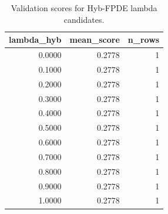 \begin{table}[t]
\caption{Validation scores for Hyb-FPDE lambda candidates.}
\label{tab:lambda_distribution_computed}
\centering
\begin{tabular}{rrr}
\toprule
lambda\_hyb & mean\_score & n\_rows \\
\midrule
0.0000 & 0.2778 & 1 \\
0.1000 & 0.2778 & 1 \\
0.2000 & 0.2778 & 1 \\
0.3000 & 0.2778 & 1 \\
0.4000 & 0.2778 & 1 \\
0.5000 & 0.2778 & 1 \\
0.6000 & 0.2778 & 1 \\
0.7000 & 0.2778 & 1 \\
0.8000 & 0.2778 & 1 \\
0.9000 & 0.2778 & 1 \\
1.0000 & 0.2778 & 1 \\
\bottomrule
\end{tabular}

\end{table}
